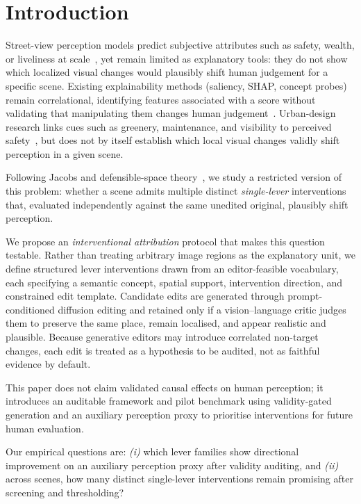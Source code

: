 \section{Introduction}
\label{sec:intro}

Street-view perception models predict subjective attributes such as
safety, wealth, or liveliness at scale~\cite{salesses2013,naik2014,dubey2016},
yet remain limited as explanatory tools: they do not show which
localized visual changes would plausibly shift human judgement for a
specific scene. Existing explainability methods (saliency, SHAP,
concept probes) remain correlational, identifying features associated
with a score without validating that manipulating them changes human
judgement~\cite{adebayo2018,kim2018}. Urban-design research links cues
such as greenery, maintenance, and visibility to perceived
safety~\cite{li2015greenery,jiang2018brokenwindows,portnov2020lighting},
but does not by itself establish which local visual changes validly
shift perception in a given scene.

Following Jacobs and defensible-space theory~\cite{jacobs1961,newman1972},
we study a restricted version of this problem: whether a scene admits
multiple distinct \emph{single-lever} interventions that, evaluated
independently against the same unedited original, plausibly shift
perception.

We propose an \emph{interventional attribution} protocol that makes this
question testable. Rather than treating arbitrary image regions as the
explanatory unit, we define structured lever interventions drawn from an
editor-feasible vocabulary, each specifying a semantic concept, spatial
support, intervention direction, and constrained edit template.
Candidate edits are generated through prompt-conditioned diffusion
editing and retained only if a vision--language critic judges them to
preserve the same place, remain localised, and appear realistic and
plausible. Because generative editors may introduce correlated
non-target changes, each edit is treated as a hypothesis to be audited,
not as faithful evidence by default.

This paper does not claim validated causal effects on human perception; it introduces an auditable framework and pilot benchmark using validity-gated generation and an auxiliary perception proxy to prioritise interventions for future human evaluation.

Our empirical questions are: \emph{(i)} which lever families show directional improvement on an auxiliary perception proxy after validity auditing, and \emph{(ii)} across scenes, how many distinct single-lever interventions remain promising after screening and thresholding?


